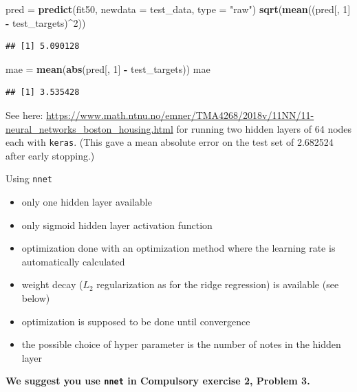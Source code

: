\documentclass[10pt,ignorenonframetext,]{beamer}
\newenvironment{Shaded}{\begin{snugshade}}{\end{snugshade}}
\newcommand{\DataTypeTok}[1]{\textcolor[rgb]{0.13,0.29,0.53}{#1}}
\newcommand{\DecValTok}[1]{\textcolor[rgb]{0.00,0.00,0.81}{#1}}
\newcommand{\KeywordTok}[1]{\textcolor[rgb]{0.13,0.29,0.53}{\textbf{#1}}}
\newcommand{\NormalTok}[1]{#1}
\newcommand{\OperatorTok}[1]{\textcolor[rgb]{0.81,0.36,0.00}{\textbf{#1}}}
\newcommand{\StringTok}[1]{\textcolor[rgb]{0.31,0.60,0.02}{#1}}
\providecommand{\tightlist}{%
  \setlength{\itemsep}{0pt}\setlength{\parskip}{0pt}}
\begin{document}
\begin{frame}[fragile]
\begin{Shaded}
\begin{Highlighting}[]
\NormalTok{pred =}\StringTok{ }\KeywordTok{predict}\NormalTok{(fit50, }\DataTypeTok{newdata =}\NormalTok{ test_data, }\DataTypeTok{type =} \StringTok{"raw"}\NormalTok{)}
\KeywordTok{sqrt}\NormalTok{(}\KeywordTok{mean}\NormalTok{((pred[, }\DecValTok{1}\NormalTok{] }\OperatorTok{-}\StringTok{ }\NormalTok{test_targets)}\OperatorTok{^}\DecValTok{2}\NormalTok{))}
\end{Highlighting}
\end{Shaded}

\begin{verbatim}
## [1] 5.090128
\end{verbatim}

\begin{Shaded}
\begin{Highlighting}[]
\NormalTok{mae =}\StringTok{ }\KeywordTok{mean}\NormalTok{(}\KeywordTok{abs}\NormalTok{(pred[, }\DecValTok{1}\NormalTok{] }\OperatorTok{-}\StringTok{ }\NormalTok{test_targets))}
\NormalTok{mae}
\end{Highlighting}
\end{Shaded}

\begin{verbatim}
## [1] 3.535428
\end{verbatim}

\normalsize

See here:
\url{https://www.math.ntnu.no/emner/TMA4268/2018v/11NN/11-neural_networks_boston_housing.html}
for running two hidden layers of 64 nodes each with \texttt{keras}.
(This gave a mean absolute error on the test set of 2.682524 after early
stopping.)

\end{frame}

\begin{frame}[fragile]

\begin{block}{Using \texttt{nnet}}

\begin{itemize}
\tightlist
\item
  only one hidden layer available
\item
  only sigmoid hidden layer activation function
\item
  optimization done with an optimization method where the learning rate
  is automatically calculated
\item
  weight decay (\(L_2\) regularization as for the ridge regression) is
  available (see below)
\item
  optimization is supposed to be done until convergence
\item
  the possible choice of hyper parameter is the number of notes in the
  hidden layer
\end{itemize}

\textbf{We suggest you use \texttt{nnet} in Compulsory exercise 2,
Problem 3.}

\end{block}

\end{frame}
\end{document}
